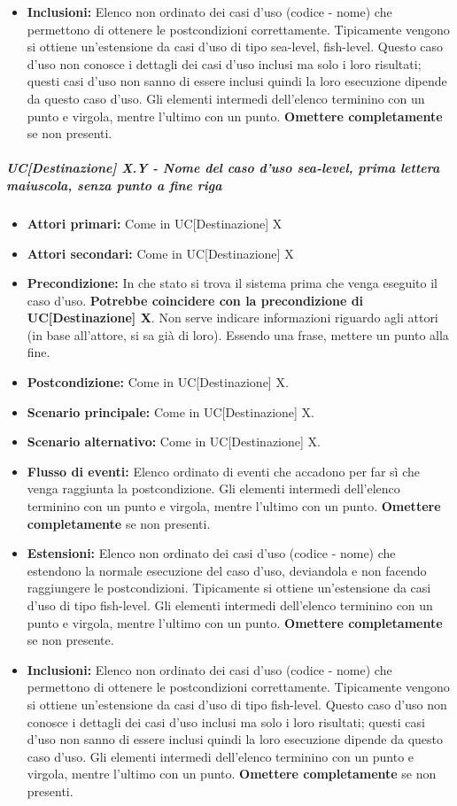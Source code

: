 \begin{itemize}
\item \textbf{Inclusioni:} Elenco non ordinato dei casi d'uso (codice - nome) che permettono di ottenere le postcondizioni correttamente. Tipicamente vengono si ottiene un'estensione da casi d'uso di tipo sea-level, fish-level. Questo caso d'uso non conosce i dettagli dei casi d'uso inclusi ma solo i loro risultati; questi casi d'uso non sanno di essere inclusi quindi la loro esecuzione dipende da questo caso d'uso. Gli elementi intermedi dell'elenco terminino con un punto e virgola, mentre l'ultimo con un punto. \textbf{Omettere completamente} se non presenti.
\end{itemize}

\subparagraph{UC[Destinazione] X.Y - Nome del caso d'uso sea-level, prima lettera maiuscola, senza punto a fine riga}%
\begin{itemize}
	\item \textbf{Attori primari:} Come in UC[Destinazione] X
	\item \textbf{Attori secondari:} Come in UC[Destinazione] X
	\item \textbf{Precondizione:} In che stato si trova il sistema prima che venga eseguito il caso d'uso. \textbf{Potrebbe coincidere con la precondizione di UC[Destinazione] X}. Non serve indicare informazioni riguardo agli attori (in base all'attore, si sa già di loro). Essendo una frase, mettere un punto alla fine.
	\item \textbf{Postcondizione:} Come in UC[Destinazione] X.
	\item \textbf{Scenario principale:} Come in UC[Destinazione] X.
	\item \textbf{Scenario alternativo:} Come in UC[Destinazione] X.
	\item \textbf{Flusso di eventi:} Elenco ordinato di eventi che accadono per far sì che venga raggiunta la postcondizione. Gli elementi intermedi dell'elenco terminino con un punto e virgola, mentre l'ultimo con un punto. \textbf{Omettere completamente} se non presenti.
	\item \textbf{Estensioni:} Elenco non ordinato dei casi d'uso (codice - nome) che estendono la normale esecuzione del caso d'uso, deviandola e non facendo raggiungere le postcondizioni. Tipicamente si ottiene un'estensione da casi d'uso di tipo fish-level. Gli elementi intermedi dell'elenco terminino con un punto e virgola, mentre l'ultimo con un punto. \textbf{Omettere completamente} se non presente.
	\item \textbf{Inclusioni:} Elenco non ordinato dei casi d'uso (codice - nome) che permettono di ottenere le postcondizioni correttamente. Tipicamente vengono si ottiene un'estensione da casi d'uso di tipo fish-level. Questo caso d'uso non conosce i dettagli dei casi d'uso inclusi ma solo i loro risultati; questi casi d'uso non sanno di essere inclusi quindi la loro esecuzione dipende da questo caso d'uso. Gli elementi intermedi dell'elenco terminino con un punto e virgola, mentre l'ultimo con un punto.  \textbf{Omettere completamente} se non presenti.
\end{itemize}

